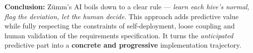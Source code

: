 \begin{encadre}
\textbf{Conclusion:} Zümm's AI boils down to a clear rule --- \emph{learn each
hive's normal, flag the deviation, let the human decide}. This approach adds
predictive value while fully respecting the constraints of self-deployment,
loose coupling and human validation of the requirements specification. It turns
the \emph{anticipated} predictive part into a \textbf{concrete and progressive}
implementation trajectory.
\end{encadre}
